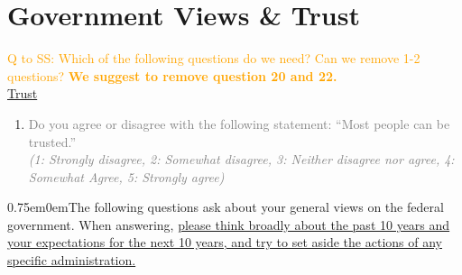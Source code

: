 \documentclass[11pt]{article}
\newcommand{\tk}[1]{\textcolor{orange}{#1}}
\begin{document}
\section*{Government Views \& Trust}
\tk{Q to SS: Which of the following questions do we need? Can we remove 1-2 questions? \textbf{We suggest to remove question 20 and 22.}}\\
\underline{Trust}
\begin{enumerate}[resume]
    \item[\sout{\theenumi.}] \textcolor{gray}{Do you agree or disagree with the following statement: “Most people can be trusted.” \\
    \textit{(1: Strongly disagree, 2: Somewhat disagree, 3: Neither disagree nor agree, 4: Somewhat Agree, 5: Strongly agree)}}
\end{enumerate}
\begin{adjustwidth}{0.75em}{0em}The following questions ask about your general views on the federal government. When answering, \uline{please think broadly about the past 10 years and your expectations for the next 10 years, and try to set aside the actions of any specific administration.}\end{adjustwidth}
\end{document}
